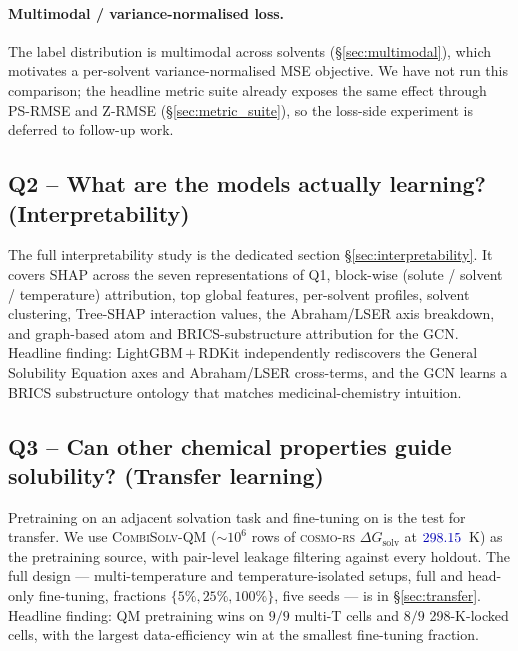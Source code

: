 \paragraph{Multimodal / variance-normalised loss.}
The label distribution is multimodal across solvents
(§\ref{sec:multimodal}), which motivates a per-solvent
variance-normalised MSE objective.  We have not run this comparison;
the headline metric suite already exposes the same effect through
PS-RMSE and Z-RMSE (§\ref{sec:metric_suite}), so the loss-side
experiment is deferred to follow-up work.

\subsection{Q2 -- What are the models actually learning? (Interpretability)}
\label{sec:ablations_q2}

The full interpretability study is the dedicated section
§\ref{sec:interpretability}.  It covers SHAP across the seven
representations of Q1, block-wise (solute / solvent / temperature)
attribution, top global features, per-solvent profiles, solvent
clustering, Tree-SHAP interaction values, the Abraham/LSER axis
breakdown, and graph-based atom and BRICS-substructure attribution
for the GCN.  Headline finding: LightGBM\,$+$\,RDKit independently
rediscovers the General Solubility Equation axes and Abraham/LSER
cross-terms, and the GCN learns a BRICS substructure ontology that
matches medicinal-chemistry intuition.

\subsection{Q3 -- Can other chemical properties guide solubility? (Transfer learning)}
\label{sec:ablations_q3}

Pretraining on an adjacent solvation task and fine-tuning on \scthree{}
is the test for transfer.  We use \textsc{CombiSolv-QM}
($\sim 10^6$ rows of \textsc{cosmo-rs} $\Delta G_{\text{solv}}$ at
$\numval{298.15}$~K) as the pretraining source, with pair-level
leakage filtering against every \scthree{} holdout.  The full design
--- multi-temperature and temperature-isolated setups, full and
head-only fine-tuning, fractions $\{5\%, 25\%, 100\%\}$, five seeds ---
is in §\ref{sec:transfer}.  Headline finding: QM pretraining wins on
$9{/}9$ multi-T cells and $8{/}9$ 298-K-locked cells, with the largest
data-efficiency win at the smallest fine-tuning fraction.

